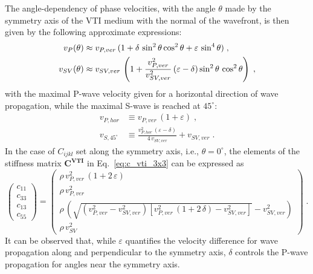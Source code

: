 The angle-dependency of phase velocities, with the angle $\theta$ made by the symmetry axis of the VTI medium with the normal of the wavefront, is then given by the following approximate expressions:
\begin{subequations}
\allowdisplaybreaks
\begin{align}
    v_P(\theta) &\approx v_{P,ver}\,(1+\delta\,\sin^2\theta\cos^2\theta+\varepsilon\,\sin^4\theta)\;,\\
    v_{SV}(\theta) &\approx v_{SV,ver}\,\left(1+\frac{v_{P,ver}^2}{v_{SV,ver}^2}\,(\varepsilon-\delta)\sin^2\theta\,\cos^2\theta\right)\;,
    \label{eq:vel_angle}
\end{align}
\end{subequations}
with the maximal P-wave velocity given for a horizontal direction of wave propagation, while the maximal S-wave is reached at $45^{\circ}$:
\begin{subequations}
    \begin{align}
    v_{P,hor} &\equiv v_{P,ver}\,(1+\varepsilon)\;,\\
    v_{S,45^{\circ}} &\equiv \frac{v_{P,hor}^2\,(\varepsilon-\delta)}{4\,v_{SV,ver}}+v_{SV,ver}\;.
    \end{align}
    \label{eq:v_aniso}
\end{subequations}
In the case of $C_{ijkl}$ set along the symmetry axis, i.e., $\theta=0^{\circ}$, the elements of the stiffness matrix $\mathbf{C}^\mathbf{VTI}$ in Eq.~\ref{eq:c_vti_3x3} can be expressed as
\begin{equation}
    \renewcommand{\arraystretch}{2}
    \begin{pmatrix}
    c_{11} \\
    c_{33} \\
    c_{13} \\
    c_{55}
    \end{pmatrix} = 
    \begin{pmatrix}
    \rho\,v_{P,ver}^2\,(1+2\,\varepsilon) \\
    \rho\,v_{P,ver}^2 \\
    \rho\,\left(\sqrt{\left(v_{P,ver}^2-v_{SV,ver}^2\right)\left[v_{P,ver}^2\,\left(1+2\,\delta\right)-v_{SV,ver}^2\right]}-v_{SV,ver}^2\right) \\
    \rho\,v_{SV}^2 
    \end{pmatrix}\;.
    \label{eq:c_vti_thomsen}
\end{equation}
It can be observed that, while $\varepsilon$ quantifies the velocity difference for wave propagation along and perpendicular to the symmetry axis, $\delta$ controls the P-wave propagation for angles near the symmetry axis. 


